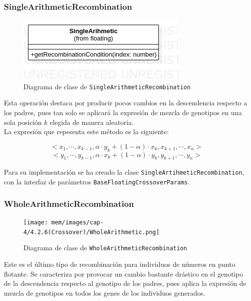 \subsubsection{SingleArithmeticRecombination}

\begin{figure}[ht]
    \centering
    \includegraphics[scale=0.7]{mem/images/cap-4/4.2.6(Crossover)/SingleArithmetic.png}
    \caption{Diagrama de clase de \texttt{SingleArithmeticRecombination}}
    \label{fig:my_label}
\end{figure}


Esta operación destaca por producir pocos cambios en la descendencia respecto a los padres, pues tan solo se aplicará la expresión de mezcla de genotipos en una sola posición $k$ elegida de manera aleatoria. \\

La expresión que repesenta este método es la siguiente:

\begin{equation}
    <x_1, \cdots ,x_{k−1}, \alpha \cdot y_k + (1 - \alpha) \cdot x_k, x_{k+1}, \cdots ,x_n >
\end{equation}
\begin{equation}
    <y_1, \cdots ,y_{k−1}, \alpha \cdot x_k + (1 - \alpha) \cdot y_k, y_{k+1}, \cdots ,y_n >
\end{equation}

Para su implementación se ha creado la clase \texttt{SingleArtihmeticRecombination}, con la interfaz de parámetros \texttt{BaseFloatingCrossoverParams}.

\subsubsection{WholeArithmeticRecombination}

\begin{figure}[ht]
    \centering
    \texttt{[image: mem/images/cap-4/4.2.6(Crossover)/WholeArithmetic.png]}
    \caption{Diagrama de clase de \texttt{WholeArithmeticRecombination}}
    \label{fig:my_label}
\end{figure}

Este es el último tipo de recombinación para individuos de números en punto flotante. Se caracteriza por provocar un cambio bastante drástico en el genotipo de la descendencia respecto al genotipo de los padres, pues aplica la expresión de mezcla de genotipos en todos los genes de los individuos generados. \\

